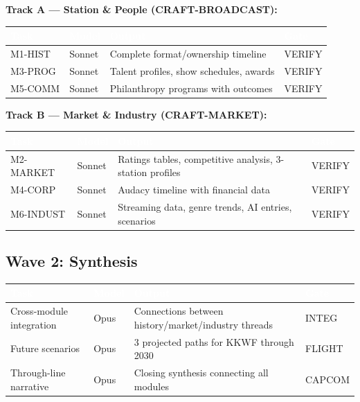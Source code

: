 \documentclass[11pt,letterpaper]{article}
\newcommand{\tableheader}[1]{\textbf{\sffamily\textcolor{white}{#1}}}
\begin{document}
\textbf{Track A --- Station \& People (CRAFT-BROADCAST):}

\begin{center}
\begin{tabularx}{\textwidth}{L{2cm}C{1.5cm}XC{1.5cm}}
\toprule
{}
\tableheader{Task} & \tableheader{Model} & \tableheader{Output} & \tableheader{Gate} \\
\midrule
M1-HIST & Sonnet & Complete format/ownership timeline & VERIFY \\
M3-PROG & Sonnet & Talent profiles, show schedules, awards & VERIFY \\
M5-COMM & Sonnet & Philanthropy programs with outcomes & VERIFY \\
\bottomrule
\end{tabularx}
\end{center}

\textbf{Track B --- Market \& Industry (CRAFT-MARKET):}

\begin{center}
\begin{tabularx}{\textwidth}{L{2cm}C{1.5cm}XC{1.5cm}}
\toprule
{}
\tableheader{Task} & \tableheader{Model} & \tableheader{Output} & \tableheader{Gate} \\
\midrule
M2-MARKET & Sonnet & Ratings tables, competitive analysis, 3-station profiles & VERIFY \\
M4-CORP & Sonnet & Audacy timeline with financial data & VERIFY \\
M6-INDUST & Sonnet & Streaming data, genre trends, AI entries, scenarios & VERIFY \\
\bottomrule
\end{tabularx}
\end{center}

\subsection{Wave 2: Synthesis}

\begin{center}
\begin{tabularx}{\textwidth}{L{2.5cm}C{1.5cm}XC{1.5cm}}
\toprule
{}
\tableheader{Task} & \tableheader{Model} & \tableheader{Output} & \tableheader{Gate} \\
\midrule
Cross-module integration & Opus & Connections between history/market/industry threads & INTEG \\
Future scenarios & Opus & 3 projected paths for KKWF through 2030 & FLIGHT \\
Through-line narrative & Opus & Closing synthesis connecting all modules & CAPCOM \\
\bottomrule
\end{tabularx}
\end{center}
\end{document}
